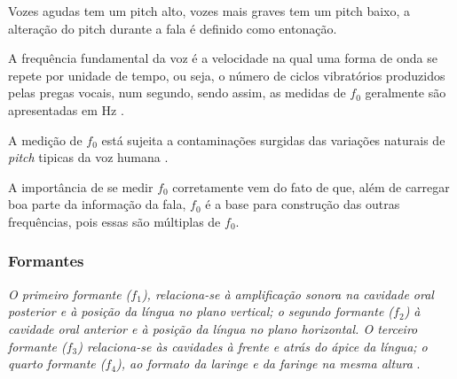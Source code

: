 \begin{myenv}{1.5}
					\par Vozes agudas tem um pitch alto, vozes mais graves tem um pitch baixo, a alteração do pitch durante a fala é definido como entonação.
					
					\par A frequência fundamental da voz é a velocidade na qual uma forma de onda se repete
					por unidade de tempo, ou seja, o número de ciclos vibratórios produzidos pelas pregas vocais, num segundo, sendo assim, as medidas de $f_0$ geralmente são apresentadas em Hz \cite{freitas2013avaliaccao}.
				
					\par A medição de $f_0$ está sujeita a contaminações surgidas das variações naturais de \textit{pitch} tipicas da voz humana \cite{freitas2013avaliaccao}.
					
					\par A importância de se medir $f_0$ corretamente vem do fato de que, além de carregar boa parte da informação da fala, $f_0$ é a base para construção das outras frequências, pois essas são múltiplas de $f_0$.
					
					\subsubsection{Formantes}
					
					\par \textit{O primeiro formante ($f_1$), relaciona-se à  amplificação  sonora  na  cavidade  oral  posterior  e  à  posição  da  língua  no  plano  vertical;  o segundo  formante  ($f_2$)  à  cavidade  oral  anterior  e  à  posição  da  língua  no  plano  horizontal.  O terceiro  formante  ($f_3$)  relaciona-se  às  cavidades  à  frente  e  atrás  do  ápice  da  língua;  o  quarto formante  ($f_4$),  ao  formato  da  laringe  e  da  faringe  na  mesma  altura} \cite{valencca2014analise}.



\end{myenv}
